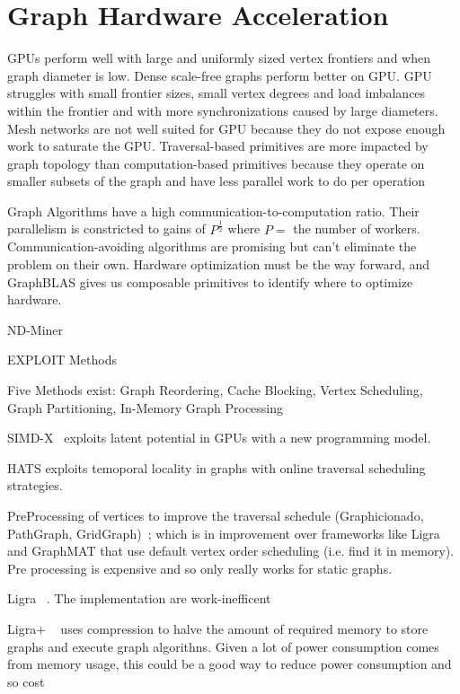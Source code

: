 \section{Graph Hardware Acceleration}
\label{section:13-Graph-Hardware-Acceleration}

GPUs perform well with large and uniformly sized vertex frontiers and when graph diameter is low. 
Dense scale-free graphs perform better on GPU.
GPU struggles with small frontier sizes, small vertex degrees and load imbalances within the frontier and with more synchronizations caused by large diameters. 
Mesh networks are not well suited for GPU because they do not expose enough work to saturate the GPU.
Traversal-based primitives are more impacted by graph topology than computation-based primitives because they operate on smaller subsets of the graph and have less parallel work to do per operation~\cite{Wu2015}

Graph Algorithms have a high communication-to-computation ratio. Their parallelism is constricted to gains of $P^{\frac{1}{2}}$ where $P=$ the number of workers. Communication-avoiding algorithms are promising but can't eliminate the problem on their own. Hardware optimization must be the way forward, and GraphBLAS gives us composable primitives to identify where to optimize hardware.~\cite{Kepner2016}

ND-Miner~\cite{Talati2022}

EXPLOIT Methods

Five Methods exist: Graph Reordering, Cache Blocking, Vertex Scheduling, Graph Partitioning, In-Memory Graph Processing

SIMD-X~\cite{Liu2019} exploits latent potential in GPUs with a new programming model.

HATS exploits temoporal locality in graphs with online traversal scheduling strategies.~\cite{Mukkara2018}

PreProcessing of vertices to improve the traversal schedule (Graphicionado, PathGraph, GridGraph)~\cite{Mukkara2018}; which is in improvement over frameworks like Ligra and GraphMAT that use default vertex order scheduling (i.e. find it in memory). Pre processing is expensive and so only really works for static graphs. 

Ligra ~\cite{Shun2013}. The implementation are work-inefficent~\cite{Dhulipala2017}

Ligra+ ~\cite{Shun2015} uses compression to halve the amount of required memory to store graphs and execute graph algorithns. Given a lot of power consumption comes from memory usage, this could be a good way to reduce power consumption and so cost 

